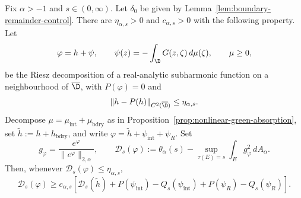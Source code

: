 
\begin{numprop}\label{prop:riesz-pair-coercivity}
Fix $\alpha>-1$ and $s\in(0,\infty)$.  Let $\delta_0$ be given by
Lemma~\ref{lem:boundary-remainder-control}.  There are
$\eta_{\alpha,s}>0$ and $c_{\alpha,s}>0$ with the following property.
Let
\[
\varphi=h+\psi,\qquad
\psi(z)=-\int_\D G(z,\zeta)\,d\mu(\zeta),\qquad \mu\ge0,
\]
be the Riesz decomposition of a real-analytic subharmonic function on a
neighbourhood of $\overline\D$, with $P(\varphi)=0$ and
\[
\|h-P(h)\|_{C^2(\overline\D)}\le\eta_{\alpha,s}.
\]
Decompose $\mu=\mu_{\mathrm{int}}+\mu_{\mathrm{bdry}}$ as in
Proposition~\ref{prop:nonlinear-green-absorption}, set
$\widetilde h:=h+h_{\mathrm{bdry}}$, and write
$\varphi=\widetilde h+\psi_{\mathrm{int}}+\psi_R$.
Set
\[
g_\varphi=\frac{e^\varphi}{\|e^\varphi\|_{2,\alpha}},
\qquad
\mathcal D_s(\varphi)
:=
\theta_\alpha(s)
-
\sup_{\tau(E)=s}\int_E g_\varphi^2\,dA_\alpha .
\]
Then, whenever $\mathcal D_s(\varphi)\le\eta_{\alpha,s}$,
\begin{equation}\label{eq:coercivity-decomposed}
\mathcal D_s(\varphi)
\ge
c_{\alpha,s}\left[
\mathcal D_s(\widetilde h)
+P(\psi_{\mathrm{int}})-Q_s(\psi_{\mathrm{int}})
+P(\psi_R)-Q_s(\psi_R)
\right].
\end{equation}
\end{numprop}

